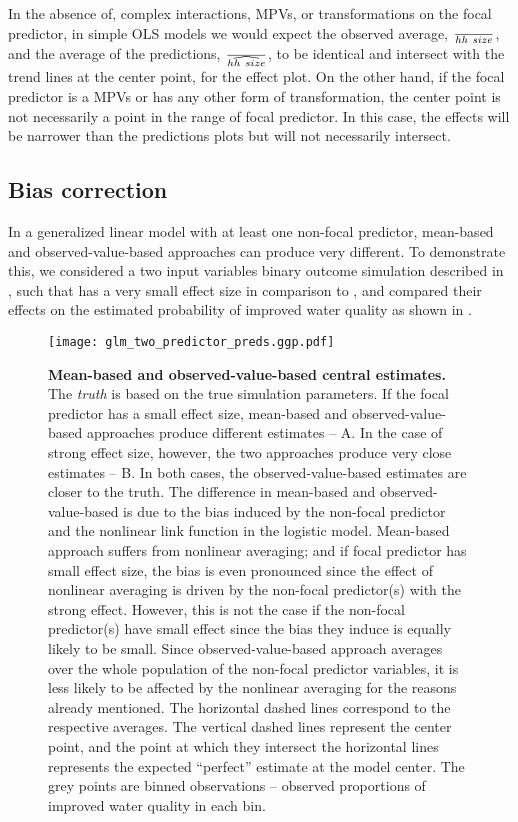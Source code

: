 In the absence of, complex interactions, MPVs, or transformations on the focal predictor, in simple OLS models we would expect the observed average, $\over{hh~size}$, and the average of the predictions, $\over{\widehat{hh~size}}$, to be identical and intersect with the trend lines at the center point, for the effect plot. On the other hand, if the focal predictor is a MPVs or has any other form of transformation, the center point is not necessarily a point in the range of focal predictor. In this case, the effects will be narrower than the predictions plots but will not necessarily intersect. 


\subsection{Bias correction}

In a generalized linear model with at least one non-focal predictor, mean-based and observed-value-based approaches can produce very different. To demonstrate this, we considered a two input variables binary outcome simulation described in , such that  has a very small effect size in comparison to , and compared their effects on the estimated probability of improved water quality as shown in . 

\begin{figure}
\begin{center}
\texttt{[image: glm\_two\_predictor\_preds.ggp.pdf]}
\end{center}
\caption{{\bf Mean-based and observed-value-based central estimates.} The \emph{truth} is based on the true simulation parameters. If the focal predictor has a small effect size, mean-based and observed-value-based approaches produce different estimates -- A. In the case of strong effect size, however, the two approaches produce very close estimates -- B. In both cases, the observed-value-based estimates are closer to the truth. The difference in mean-based and observed-value-based is due to the bias induced by the non-focal predictor and the nonlinear link function in the logistic model. Mean-based approach suffers from nonlinear averaging; and if focal predictor has small effect size, the bias is even pronounced since the effect of nonlinear averaging is driven by the non-focal predictor(s) with the strong effect. However, this is not the case if the non-focal predictor(s) have small effect since the bias they induce is equally likely to be small. Since observed-value-based approach averages over the whole population of the non-focal predictor variables, it is less likely to be affected by the nonlinear averaging for the reasons already mentioned. The horizontal dashed lines correspond to the respective averages. The vertical dashed lines represent the center point, and the point at which they intersect the horizontal lines represents the expected ``perfect'' estimate at the model center. The grey points are binned observations -- observed proportions of improved water quality in each bin.} 
\label{fig:pred_bin_plots}
\end{figure}

